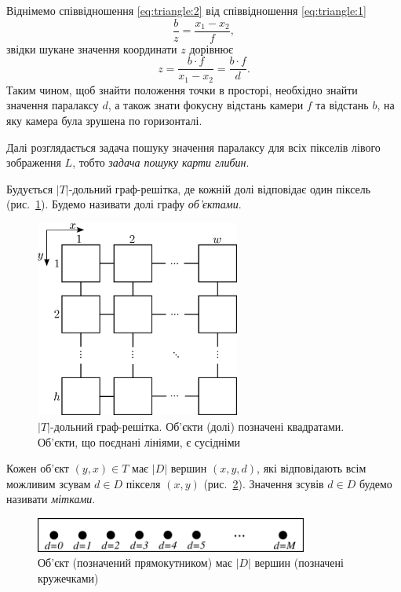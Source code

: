 Віднімемо співвідношення \eqref{eq:triangle:2} від співвідношення
\eqref{eq:triangle:1}
\begin{equation*}
    \frac{b}{z} = \frac{x_1 - x_2}{f},
\end{equation*}
звідки шукане значення координати $z$ дорівнює
\begin{equation*}
    z = \frac{b \cdot f}{x_1 - x_2} = \frac{b \cdot f}{d}.
\end{equation*}
Таким чином, щоб знайти положення точки в просторі,
необхідно знайти значення паралаксу $d$,
а також знати фокусну відстань камери $f$ та відстань  $b$,
на яку камера була зрушена по горизонталі.

Далі розглядається задача пошуку значення паралаксу для всіх пікселів
лівого зображення $L$, тобто \textit{задача пошуку карти глибин}.

Будується $\left| T \right|$-дольний граф-решітка,
де кожній долі відповідає один піксель (рис.~\ref{fig:grid:graph:pixels}).
Будемо називати долі графу \textit{об'єктами}.

\begin{figure}[h]
  \centering
  \includegraphics[width=0.6\textwidth]{images/grid_graph_pixels}
  \caption{$\left|T \right|$-дольний граф-решітка.
           Об'єкти (долі) позначені квадратами.
           Об'єкти, що поєднані лініями, є сусідніми}
  \label{fig:grid:graph:pixels}
\end{figure}


Кожен об'єкт $\left(y, x \right) \in T$ має $\left| D \right| $ вершин
$ \left( x, y, d \right)$,
які відповідають всім можливим зсувам $d \in D$ пікселя $\left(x, y \right)$
(рис.~\ref{fig:object:vertices}).
Значення зсувів $d \in D$ будемо називати \textit{мітками}.

\begin{figure}[h]
  \centering
  \includegraphics[width=0.8\textwidth]{images/object_with_vertices}
  \caption{Об'єкт (позначений прямокутником) має $\left| D \right|$ вершин
           (позначені кружечками)}
  \label{fig:object:vertices}
\end{figure}

